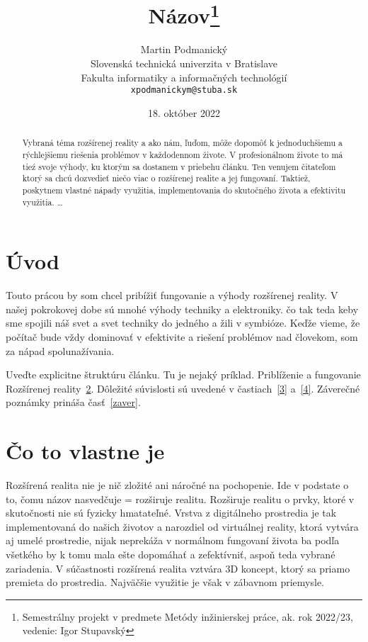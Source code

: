 \documentclass[10pt,twoside,slovak,a4paper]{article}
\title{Názov\thanks{Semestrálny projekt v predmete Metódy inžinierskej práce, ak. rok 2022/23, vedenie: Igor Stupavský}} %
\author{Martin Podmanický\\[2pt]
	{\small Slovenská technická univerzita v Bratislave}\\
	{\small Fakulta informatiky a informačných technológií}\\
	{\small \texttt{xpodmanickym@stuba.sk}}
	}
\date{\small 18. október 2022} %
\begin{document}
\maketitle

\begin{abstract}
Vybraná téma rozšírenej reality a ako nám, ľuďom, môže dopomôť k jednoduchšiemu a rýchlejšiemu riešenia problémov v každodennom živote.
V profesionálnom živote to má tieź svoje výhody, ku ktorým sa dostanem v priebehu článku. 
Ten venujem čitateľom ktorý sa chcú dozvedieť niečo viac o rozšírenej realite a jej fungovaní.
Taktiež, poskytnem vlastné nápady využitia, implementovania do skutočného života a efektivitu využitia.
\ldots
\end{abstract}



\section{Úvod}

Touto prácou by som chcel pribížiť fungovanie a výhody rozšírenej reality. V našej pokrokovej dobe sú mnohé výhody techniky a elektroniky.
čo tak teda keby sme spojili náš svet a svet techniky do jedného a žili v symbióze. Keďže vieme, že počítač bude vždy dominovať v efektivite a riešení problémov nad človekom,
som za nápad spolunažívania.

Uveďte explicitne štruktúru článku. Tu je nejaký príklad.
Priblíženie a fungovanie Rozšírenej reality~\ref{2}.
Dôležité súvislosti sú uvedené v častiach~\ref{3} a~\ref{4}.
Záverečné poznámky prináša časť~\ref{zaver}.



\section{Čo to vlastne je} \label{2}

Rozšírená realita nie je nič zložité ani náročné na pochopenie. Ide v podstate o to, čomu názov nasvedčuje = rozširuje realitu. Rozširuje realitu o prvky, ktoré v skutočnosti nie sú fyzicky hmatateľné. Vrstva z digitálneho prostredia je tak implementovaná do našich životov a narozdiel od virtuálnej reality, ktorá vytvára aj umelé prostredie, nijak neprekáža v normálnom fungovaní života ba podľa všetkého by k tomu mala ešte dopomáhať a zefektívniť, aspoň teda vybrané zariadenia. V súčastnosti rozšírená realita vztvára  3D koncept, ktorý sa priamo premieta do prostredia. Najväčšie využitie je však v zábavnom priemysle.
\end{document}
